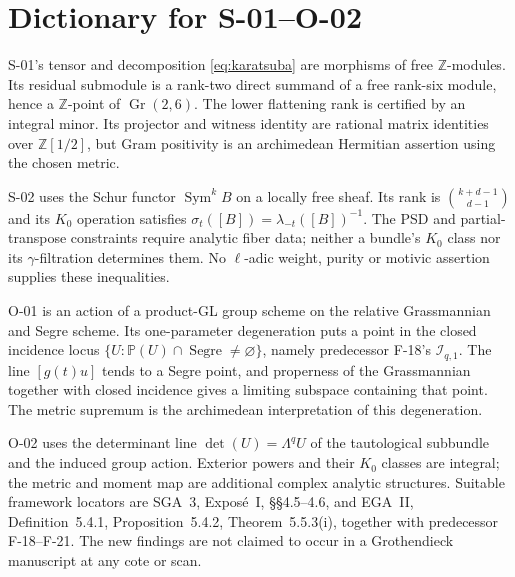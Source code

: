 \section{Dictionary for S-01--O-02}

S-01's tensor and decomposition \eqref{eq:karatsuba} are
morphisms of free $\mathbb Z$-modules. Its residual submodule
is a rank-two direct summand of a free rank-six module, hence
a $\mathbb Z$-point of $\operatorname{Gr}(2,6)$. The lower
flattening rank is certified by an integral minor. Its
projector and witness identity are rational matrix identities
over $\mathbb Z[1/2]$, but Gram positivity is an archimedean
Hermitian assertion using the chosen metric.

S-02 uses the Schur functor $\operatorname{Sym}^k B$ on a
locally free sheaf. Its rank is $\binom{k+d-1}{d-1}$ and its
$K_0$ operation satisfies $\sigma_t([B])=\lambda_{-t}([B])^{-1}$.
The PSD and partial-transpose constraints require analytic
fiber data; neither a bundle's $K_0$ class nor its
$\gamma$-filtration determines them. No $\ell$-adic weight,
purity or motivic assertion supplies these inequalities.

O-01 is an action of a product-GL group scheme on the relative
Grassmannian and Segre scheme. Its one-parameter degeneration
puts a point in the closed incidence locus
$\{U:\mathbb P(U)\cap\operatorname{Segre}\ne\varnothing\}$,
namely predecessor F-18's $\mathcal I_{q,1}$. The line
$[g(t)u]$ tends to a Segre point, and properness of the
Grassmannian together with closed incidence gives a limiting
subspace containing that point. The metric supremum is the
archimedean interpretation of this degeneration.

O-02 uses the determinant line $\det(U)=\Lambda^qU$ of the
tautological subbundle and the induced group action. Exterior
powers and their $K_0$ classes are integral; the metric and
moment map are additional complex analytic structures.
Suitable framework locators are SGA~3, Expos\'e~I,
\S\S4.5--4.6, and EGA~II, Definition~5.4.1,
Proposition~5.4.2, Theorem~5.5.3(i), together with predecessor
F-18--F-21. The new findings are not claimed to occur in a
Grothendieck manuscript at any cote or scan.
